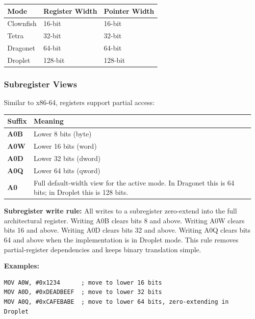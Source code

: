 \documentclass[11pt]{article}
\begin{document}
\begin{table}[h]
\centering
\begin{tabular}{@{}lll@{}}
\toprule
\textbf{Mode} & \textbf{Register Width} & \textbf{Pointer Width} \\ \midrule
Clownfish & 16-bit & 16-bit \\
Tetra & 32-bit & 32-bit \\
Dragonet & 64-bit & 64-bit \\
Droplet & 128-bit & 128-bit \\\bottomrule
\end{tabular}
\end{table}

\subsubsection{Subregister Views}

Similar to x86-64, registers support partial access:

\begin{table}[h]
\centering
\begin{tabular}{@{}L{2.2cm}L{10cm}@{}}
\toprule
\textbf{Suffix} & \textbf{Meaning} \\ \midrule
\textbf{A0B} & Lower 8 bits (byte) \\
\textbf{A0W} & Lower 16 bits (word) \\
\textbf{A0D} & Lower 32 bits (dword) \\
\textbf{A0Q} & Lower 64 bits (qword) \\
\textbf{A0} & Full default-width view for the active mode. In Dragonet this is 64 bits; in Droplet this is 128 bits. \\ \bottomrule
\end{tabular}
\end{table}

\textbf{Subregister write rule:} All writes to a subregister zero-extend into the full architectural register. Writing A0B clears bits 8 and above. Writing A0W clears bits 16 and above. Writing A0D clears bits 32 and above. Writing A0Q clears bits 64 and above when the implementation is in Droplet mode. This rule removes partial-register dependencies and keeps binary translation simple.

\textbf{Examples:}

\begin{lstlisting}
MOV A0W, #0x1234      ; move to lower 16 bits
MOV A0D, #0xDEADBEEF  ; move to lower 32 bits
MOV A0Q, #0xCAFEBABE  ; move to lower 64 bits, zero-extending in Droplet
\end{lstlisting}
\end{document}
